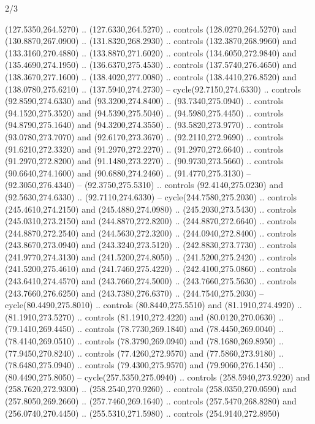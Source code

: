 \begin{flagdescription}{2/3}
\begin{scope}[xshift=0.5\flaglength,yshift=0.5\flagwidth,scale=\stretchfactor]
\begin{scope}[scale=0.001645\flagwidth,yshift=65mm,xshift=-63mm]
\begin{scope}[y=0.80pt, x=0.80pt, yscale=-1,]
\begin{scope}[cm={{1.33333,0.0,0.0,1.33333,(0.0,1e-05)}}]
  (127.5350,264.5270) .. (127.6330,264.5270) .. controls (128.0270,264.5270) and
  (130.8870,267.0900) .. (131.8320,268.2930) .. controls (132.3870,268.9960) and
  (133.3160,270.4880) .. (133.8870,271.6020) .. controls (134.6050,272.9840) and
  (135.4690,274.1950) .. (136.6370,275.4530) .. controls (137.5740,276.4650) and
  (138.3670,277.1600) .. (138.4020,277.0080) .. controls (138.4410,276.8520) and
  (138.0780,275.6210) .. (137.5940,274.2730) -- cycle(92.7150,274.6330) ..
  controls (92.8590,274.6330) and (93.3200,274.8400) .. (93.7340,275.0940) ..
  controls (94.1520,275.3520) and (94.5390,275.5040) .. (94.5980,275.4450) ..
  controls (94.8790,275.1640) and (94.3200,274.3550) .. (93.5820,273.9770) ..
  controls (93.0780,273.7070) and (92.6170,273.3670) .. (92.2110,272.9690) ..
  controls (91.6210,272.3320) and (91.2970,272.2270) .. (91.2970,272.6640) ..
  controls (91.2970,272.8200) and (91.1480,273.2270) .. (90.9730,273.5660) ..
  controls (90.6640,274.1600) and (90.6880,274.2460) .. (91.4770,275.3130) --
  (92.3050,276.4340) -- (92.3750,275.5310) .. controls (92.4140,275.0230) and
  (92.5630,274.6330) .. (92.7110,274.6330) -- cycle(244.7580,275.2030) ..
  controls (245.4610,274.2150) and (245.4880,274.0980) .. (245.2030,273.5430) ..
  controls (245.0310,273.2150) and (244.8870,272.8200) .. (244.8870,272.6640) ..
  controls (244.8870,272.2540) and (244.5630,272.3200) .. (244.0940,272.8400) ..
  controls (243.8670,273.0940) and (243.3240,273.5120) .. (242.8830,273.7730) ..
  controls (241.9770,274.3130) and (241.5200,274.8050) .. (241.5200,275.2420) ..
  controls (241.5200,275.4610) and (241.7460,275.4220) .. (242.4100,275.0860) ..
  controls (243.6410,274.4570) and (243.7660,274.5000) .. (243.7660,275.5630) ..
  controls (243.7660,276.6250) and (243.7380,276.6370) .. (244.7540,275.2030) --
  cycle(80.4490,275.8010) .. controls (80.8440,275.5510) and (81.1910,274.4920)
  .. (81.1910,273.5270) .. controls (81.1910,272.4220) and (80.0120,270.0630) ..
  (79.1410,269.4450) .. controls (78.7730,269.1840) and (78.4450,269.0040) ..
  (78.4140,269.0510) .. controls (78.3790,269.0940) and (78.1680,269.8950) ..
  (77.9450,270.8240) .. controls (77.4260,272.9570) and (77.5860,273.9180) ..
  (78.6480,275.0940) .. controls (79.4300,275.9570) and (79.9060,276.1450) ..
  (80.4490,275.8050) -- cycle(257.5350,275.0940) .. controls (258.5940,273.9220)
  and (258.7620,272.9300) .. (258.2540,270.9260) .. controls (258.0350,270.0590)
  and (257.8050,269.2660) .. (257.7460,269.1640) .. controls (257.5470,268.8280)
  and (256.0740,270.4450) .. (255.5310,271.5980) .. controls (254.9140,272.8950)

\end{scope}
\end{scope}
\end{scope}
\end{scope}
\end{flagdescription}
